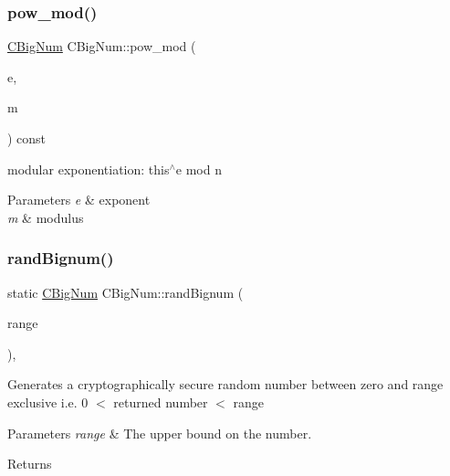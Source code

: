 \subsubsection{\texorpdfstring{pow\+\_\+mod()}{pow\_mod()}}
{\footnotesize\ttfamily \mbox{\hyperlink{class_c_big_num}{C\+Big\+Num}} C\+Big\+Num\+::pow\+\_\+mod (\begin{DoxyParamCaption}\item[{const \mbox{\hyperlink{class_c_big_num}{C\+Big\+Num}} \&}]{e,  }\item[{const \mbox{\hyperlink{class_c_big_num}{C\+Big\+Num}} \&}]{m }\end{DoxyParamCaption}) const\hspace{0.3cm}{\ttfamily [inline]}}

modular exponentiation\+: this$^\wedge$e mod n 
\begin{DoxyParams}{Parameters}
{\em e} & exponent \\
\hline
{\em m} & modulus \\
\hline
\end{DoxyParams}
\mbox{\label{class_c_big_num_a83e20522f042dd2b738bd26e21605e3b}} 
\subsubsection{\texorpdfstring{rand\+Bignum()}{randBignum()}}
{\footnotesize\ttfamily static \mbox{\hyperlink{class_c_big_num}{C\+Big\+Num}} C\+Big\+Num\+::rand\+Bignum (\begin{DoxyParamCaption}\item[{const \mbox{\hyperlink{class_c_big_num}{C\+Big\+Num}} \&}]{range }\end{DoxyParamCaption})\hspace{0.3cm}{\ttfamily [inline]}, {\ttfamily [static]}}

Generates a cryptographically secure random number between zero and range exclusive i.\+e. 0 $<$ returned number $<$ range 
\begin{DoxyParams}{Parameters}
{\em range} & The upper bound on the number. \\
\hline
\end{DoxyParams}
\begin{DoxyReturn}{Returns}

\end{DoxyReturn}
\mbox{\label{class_c_big_num_a200174f8261baebceb64b24a2d91f33f}} 
